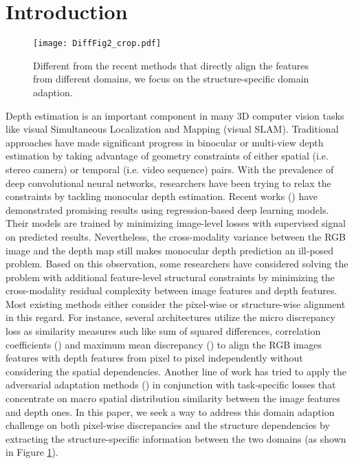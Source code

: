 \documentclass[letterpaper]{article} \usepackage{aaai20}  \usepackage{times}  \usepackage{helvet} \usepackage{courier}  \usepackage{graphicx} \frenchspacing  \setlength{\pdfpagewidth}{8.5in}  \setlength{\pdfpageheight}{11in}  \usepackage{epsfig}
\begin{document}
\section{Introduction} 
    \begin{figure}[t]
    \begin{center}
       \texttt{[image: DiffFig2\_crop.pdf]}
    \end{center}
    \vspace{-11pt}
       \caption{Different from the recent methods that directly align the features from different domains, we focus on the structure-specific domain adaption.}
       \vspace{-12pt}
    \label{DiffFig}
    \end{figure}
    Depth estimation is an important component in many 3D computer vision tasks like visual Simultaneous Localization and Mapping (visual SLAM). Traditional approaches have made significant progress in binocular or multi-view depth estimation by taking advantage of geometry constraints of either spatial (i.e. stereo camera) or temporal (i.e. video sequence) pairs. With the prevalence of deep convolutional neural networks, researchers have been trying to relax the constraints by tackling monocular depth estimation. Recent works (\cite{Wang2015Towards,Roy2016Monocular,Kuznietsov2017Semi,Kim2016Unified,Fu2018Deep,Eigen2015Predicting}) have demonstrated promising results using regression-based deep learning models. Their models are trained by minimizing image-level losses with supervised signal on predicted results. Nevertheless, the cross-modality variance between the RGB image and the depth map still makes monocular depth prediction an ill-posed problem. Based on this observation, some researchers have considered solving the problem with additional feature-level structural constraints by minimizing the cross-modality residual complexity between image features and depth features. Most existing methods either consider the pixel-wise or structure-wise alignment in this regard. For instance, several architectures utilize the micro discrepancy loss as similarity measures such like sum of squared differences, correlation coefficients (\cite{Myronenko2010Intensity}) and maximum mean discrepancy (\cite{Ghifary2015Domain,Long2015Learning}) to align the RGB images features with depth features from pixel to pixel independently without considering the spatial dependencies. Another line of work has tried to apply the adversarial adaptation methods (\cite{Kundu2018AdaDepth,Tzeng2017Adversarial,Judy2015Simultaneous}) in conjunction with task-specific losses that concentrate on macro spatial distribution similarity between the image features and depth ones. In this paper, we seek a way to address this domain adaption challenge on both pixel-wise discrepancies and the structure dependencies by extracting the structure-specific information between the two domains (as shown in Figure \ref{DiffFig}).\\
\end{document}
